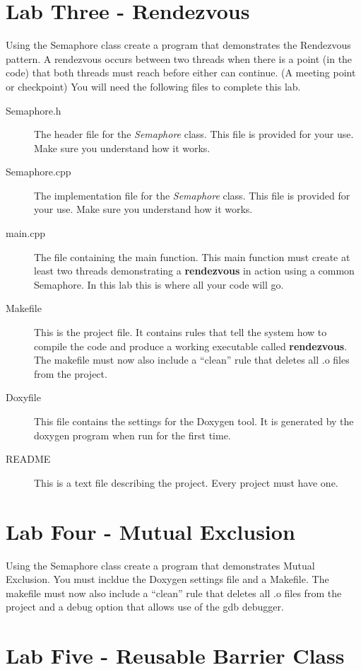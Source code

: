 \documentclass[10pt,a4paper]{article}
\begin{document}
 \section{Lab Three - Rendezvous}
 Using the Semaphore class create a program that demonstrates the Rendezvous pattern.  A rendezvous occurs between two threads when there is a point (in the code) that both threads must reach before either can continue. (A meeting point or checkpoint)
 You will need the following files to complete this lab.
\begin{description}
\item[Semaphore.h] The header file for the \textit{Semaphore} class.  This file is provided for your use.  Make sure you understand how it works.
\item[Semaphore.cpp] The implementation file for the \textit{Semaphore} class.  This file is provided for your use.  Make sure you understand how it works.
\item[main.cpp] The file containing the main function.  This main function must create at least two threads demonstrating a \textbf{rendezvous} in action using a common Semaphore.  In this lab this is where all your code will go.
\item[Makefile] This is the project file. It contains rules that tell the system how to compile the code and produce a working executable called \textbf{rendezvous}. The makefile must now also include a “clean” rule that deletes all .o files from the project.
\item[Doxyfile] This file contains the settings for the Doxygen tool. It is generated by the doxygen program when run for the first time.
\item[README] This is a text file describing the project. Every project must have one.
\end{description}





 
 \section{Lab Four - Mutual Exclusion}

Using the Semaphore class create a program that demonstrates Mutual Exclusion. You must  incldue the Doxygen settings file and a Makefile.  The makefile must now also include a “clean” rule that deletes all .o files from the project and a debug option that allows use of the gdb debugger.  

 \section{Lab Five - Reusable Barrier Class}
\end{document}
